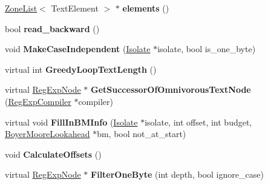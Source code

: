\begin{DoxyCompactItemize}
\item 
\hyperlink{classv8_1_1internal_1_1_zone_list}{Zone\+List}$<$ Text\+Element $>$ $\ast$ {\bfseries elements} ()\hypertarget{classv8_1_1internal_1_1_text_node_adaf2c35d3b69231b4bbb700f87ff0eb4}{}\label{classv8_1_1internal_1_1_text_node_adaf2c35d3b69231b4bbb700f87ff0eb4}

\item 
bool {\bfseries read\+\_\+backward} ()\hypertarget{classv8_1_1internal_1_1_text_node_ab4c9edf867bef53a95e33253d04468ac}{}\label{classv8_1_1internal_1_1_text_node_ab4c9edf867bef53a95e33253d04468ac}

\item 
void {\bfseries Make\+Case\+Independent} (\hyperlink{classv8_1_1internal_1_1_isolate}{Isolate} $\ast$isolate, bool is\+\_\+one\+\_\+byte)\hypertarget{classv8_1_1internal_1_1_text_node_ab554495b2be955377b56b8f11cdd33db}{}\label{classv8_1_1internal_1_1_text_node_ab554495b2be955377b56b8f11cdd33db}

\item 
virtual int {\bfseries Greedy\+Loop\+Text\+Length} ()\hypertarget{classv8_1_1internal_1_1_text_node_a104f743988dbe90dc16dcf4a192645d5}{}\label{classv8_1_1internal_1_1_text_node_a104f743988dbe90dc16dcf4a192645d5}

\item 
virtual \hyperlink{classv8_1_1internal_1_1_reg_exp_node}{Reg\+Exp\+Node} $\ast$ {\bfseries Get\+Successor\+Of\+Omnivorous\+Text\+Node} (\hyperlink{classv8_1_1internal_1_1_reg_exp_compiler}{Reg\+Exp\+Compiler} $\ast$compiler)\hypertarget{classv8_1_1internal_1_1_text_node_a134934f721860833acc1d0b5b60c9d49}{}\label{classv8_1_1internal_1_1_text_node_a134934f721860833acc1d0b5b60c9d49}

\item 
virtual void {\bfseries Fill\+In\+B\+M\+Info} (\hyperlink{classv8_1_1internal_1_1_isolate}{Isolate} $\ast$isolate, int offset, int budget, \hyperlink{classv8_1_1internal_1_1_boyer_moore_lookahead}{Boyer\+Moore\+Lookahead} $\ast$bm, bool not\+\_\+at\+\_\+start)\hypertarget{classv8_1_1internal_1_1_text_node_a44926d64bdbaaae8c5052ac7885fcac7}{}\label{classv8_1_1internal_1_1_text_node_a44926d64bdbaaae8c5052ac7885fcac7}

\item 
void {\bfseries Calculate\+Offsets} ()\hypertarget{classv8_1_1internal_1_1_text_node_a12a59535555258c7ef5415d28e6bc152}{}\label{classv8_1_1internal_1_1_text_node_a12a59535555258c7ef5415d28e6bc152}

\item 
virtual \hyperlink{classv8_1_1internal_1_1_reg_exp_node}{Reg\+Exp\+Node} $\ast$ {\bfseries Filter\+One\+Byte} (int depth, bool ignore\+\_\+case)\hypertarget{classv8_1_1internal_1_1_text_node_a7a69690dcf46c2589440a4a2811049c5}{}\label{classv8_1_1internal_1_1_text_node_a7a69690dcf46c2589440a4a2811049c5}

\end{DoxyCompactItemize}
